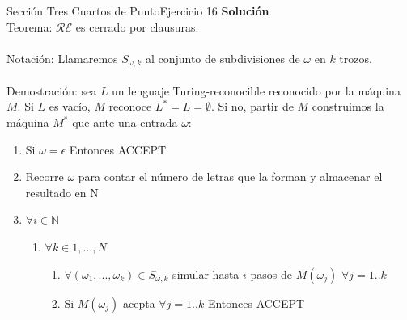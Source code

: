 \documentclass[10pt, envcountsect, presentation, aspectratio=169]{beamer}
\begin{document}

\begin{frame}{Sección Tres Cuartos de Punto}{Ejercicio 16}
    \textbf{Solución}\\
    Teorema: $\mathcal{RE}$ es cerrado por clausuras.\\~\\
    Notación: Llamaremos $S_{\omega, k}$ al conjunto de subdivisiones de $\omega$ en $k$ trozos.\\~\\ 
    Demostración: sea $L$ un lenguaje Turing-reconocible reconocido por la máquina $M$. Si $L$ es vacío, $M$ reconoce $L^*=L=\emptyset$. Si no, partir de $M$ construimos la máquina $M^*$ que ante una entrada $\omega$:
    \begin{enumerate}
        \item Si $\omega = \epsilon$ Entonces ACCEPT 
        \item Recorre $\omega$ para contar el número de letras que la forman y almacenar el resultado en N
        \item $\forall i \in \mathbb{N}$
        \begin{enumerate}
            \item $\forall k \in {1,...,N}$
            \begin{enumerate}
                \item $\forall (\omega_1,...,\omega_k) \in S_{\omega, k}$ simular hasta $i$ pasos de $M(\omega_j)$ $\forall j=1..k$
                \item Si $M(\omega_j)$ acepta $\forall j=1..k$ Entonces ACCEPT
            \end{enumerate}
        \end{enumerate}
    \end{enumerate}
\end{frame}

\end{document}
